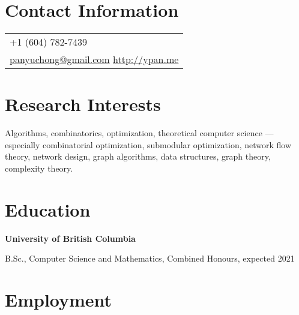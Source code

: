 \documentclass[margin,line]{res}
\newenvironment{list1}{
  \begin{list}{\ding{113}}{%
      \setlength{\itemsep}{0in}
      \setlength{\parsep}{0.025in} \setlength{\parskip}{0in}
      \setlength{\topsep}{0in} \setlength{\partopsep}{0in}
      \setlength{\leftmargin}{0.17in}}}{\end{list}}
\newenvironment{list2}{
  \begin{list}{$\bullet$}{%
      \setlength{\itemsep}{0in}
      \setlength{\parsep}{0in} \setlength{\parskip}{0in}
      \setlength{\topsep}{0in} \setlength{\partopsep}{0in}
      \setlength{\leftmargin}{0.2in}}}{\end{list}}
\begin{document}

\begin{resume}

\section{\sc Contact Information}

\vspace{.05in}
\begin{tabular}{p{2in}}
+1 (604) 782-7439 \\
\href{mailto:panyuchong@gmail.com}{panyuchong@gmail.com}
\href{http://ypan.me/}{http://ypan.me}
\end{tabular}


\section{\sc Research Interests}
Algorithms, combinatorics, optimization, theoretical computer science --- especially combinatorial optimization, submodular optimization, network flow theory, network design, graph algorithms, data structures, graph theory, complexity theory.

\section{\sc Education}

{\bf University of British Columbia}\\
\vspace*{-.1in}
\begin{list1}
\item[] B.Sc., Computer Science and Mathematics, Combined Honours, expected 2021
\end{list1}


\section{\sc Employment}


\end{resume}
\end{document}
